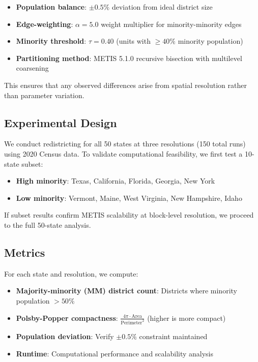 \begin{itemize}
    \item \textbf{Population balance}: $\pm 0.5\%$ deviation from ideal district size
    \item \textbf{Edge-weighting}: $\alpha = 5.0$ weight multiplier for minority-minority edges
    \item \textbf{Minority threshold}: $\tau = 0.40$ (units with $\geq 40\%$ minority population)
    \item \textbf{Partitioning method}: METIS 5.1.0 recursive bisection with multilevel coarsening
\end{itemize}

This ensures that any observed differences arise from spatial resolution rather than parameter variation.

\subsection{Experimental Design}

We conduct redistricting for all 50 states at three resolutions (150 total runs) using 2020 Census data. To validate computational feasibility, we first test a 10-state subset:

\begin{itemize}
    \item \textbf{High minority}: Texas, California, Florida, Georgia, New York
    \item \textbf{Low minority}: Vermont, Maine, West Virginia, New Hampshire, Idaho
\end{itemize}

If subset results confirm METIS scalability at block-level resolution, we proceed to the full 50-state analysis.

\subsection{Metrics}

For each state and resolution, we compute:

\begin{itemize}
    \item \textbf{Majority-minority (MM) district count}: Districts where minority population $> 50\%$
    \item \textbf{Polsby-Popper compactness}: $\frac{4\pi \cdot \text{Area}}{\text{Perimeter}^2}$ (higher is more compact)
    \item \textbf{Population deviation}: Verify $\pm 0.5\%$ constraint maintained
    \item \textbf{Runtime}: Computational performance and scalability analysis
\end{itemize}

